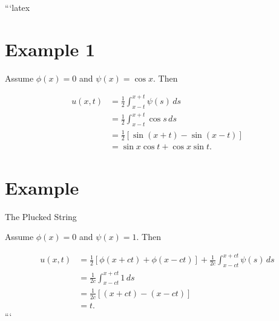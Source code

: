```latex
\section*{Example 1}

Assume $\phi(x) = 0$ and $\psi(x) = \cos x$. Then

\begin{align*}
    u(x, t) &= \frac{1}{2} \int_{x-t}^{x+t} \psi(s) \, ds \\
    &= \frac{1}{2} \int_{x-t}^{x+t} \cos s \, ds \\
    &= \frac{1}{2} \left[ \sin(x+t) - \sin(x-t) \right] \\
    &= \sin x \cos t + \cos x \sin t.
\end{align*}

\section*{Example}

The Plucked String

Assume $\phi(x) = 0$ and $\psi(x) = 1$. Then

\begin{align*}
    u(x, t) &= \frac{1}{2} \left[ \phi(x+ct) + \phi(x-ct) \right] + \frac{1}{2c} \int_{x-ct}^{x+ct} \psi(s) \, ds \\
    &= \frac{1}{2c} \int_{x-ct}^{x+ct} 1 \, ds \\
    &= \frac{1}{2c} \left[ (x+ct) - (x-ct) \right] \\
    &= t.
\end{align*}
```
